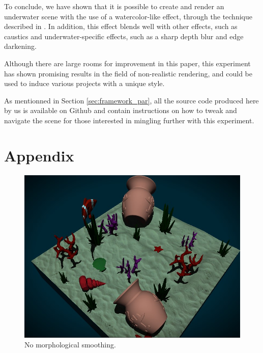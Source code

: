 \documentclass{article}
\begin{document}
To conclude, we have shown that it is possible to create and render an underwater scene with the use of a 
watercolor-like effect, through the technique described in \cite{watercolor_paper}. 
In addition, this effect blends well with other effects, such as caustics and underwater-specific effects, such 
as a sharp depth blur and edge darkening.

\medskip \par
\noindent
Although there are large rooms for improvement in this paper, this experiment has shown promising results 
in the field of non-realistic rendering, and could be used to induce various projects with a unique style.

\medskip \par
\noindent
As mentionned in Section \ref{sec:framework_par}, all the source code produced here by us is available on 
Github and contain instructions on how to tweak and navigate the scene for those interested in mingling further
with this experiment.



\newpage
\section{Appendix}
\label{sec:appendix}

\begin{figure}[h]
    \centering
    \includegraphics[width=\columnwidth]{imgs/no_smoothing_2.jpg}
    \caption{No morphological smoothing.}
    \label{fig:no_ms}
\end{figure}
\end{document}
